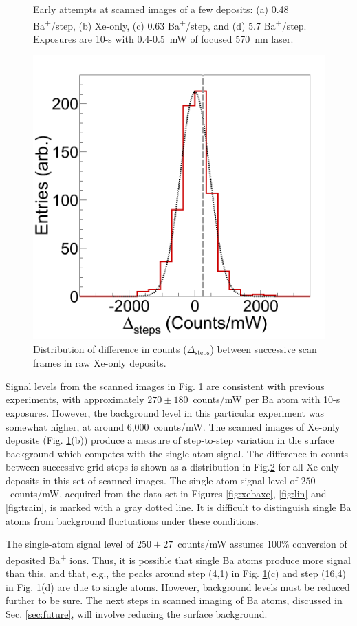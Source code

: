 \begin{figure}
                \caption{Early attempts at scanned images of a few deposits: (a) 0.48 Ba\textsuperscript{+}/step, (b) Xe-only, (c) 0.63 Ba\textsuperscript{+}/step, and (d) 5.7 Ba\textsuperscript{+}/step.  Exposures are 10-s with 0.4-0.5~mW of focused 570~nm laser.}
\label{fig:scans}
\end{figure}

\begin{figure} %
        \centering
                \includegraphics[width=.5\textwidth]{figures/xevarxe_scanDelta_trendline.png}
                \caption{Distribution of difference in counts ($\Delta_{\text{steps}}$) between successive scan frames in raw Xe-only deposits.}
\label{fig:scanVarXe}
\end{figure}

Signal levels from the scanned images in Fig. \ref{fig:scans} are consistent with previous experiments, with approximately $270 \pm 180$~counts/mW per Ba atom with 10-s exposures.  However, the background level in this particular experiment was somewhat higher, at around 6,000~counts/mW.  The scanned images of Xe-only deposits (Fig. \ref{fig:scans}(b)) produce a measure of step-to-step variation in the surface background which competes with the single-atom signal.  The difference in counts between successive grid steps is shown as a distribution in Fig.\ref{fig:scanVarXe} for all Xe-only deposits in this set of scanned images.  The single-atom signal level of $250$~counts/mW, acquired from the data set in Figures \ref{fig:xebaxe}, \ref{fig:lin} and \ref{fig:train}, is marked with a gray dotted line.  It is difficult to distinguish single Ba atoms from background fluctuations under these conditions.

The single-atom signal level of $250 \pm 27$~counts/mW assumes 100\% conversion of deposited Ba\textsuperscript{+} ions.  Thus, it is possible that single Ba atoms produce more signal than this, and that, e.g., the peaks around step (4,1) in Fig. \ref{fig:scans}(c) and step (16,4) in Fig. \ref{fig:scans}(d) are due to single atoms.  However, background levels must be reduced further to be sure.  The next steps in scanned imaging of Ba atoms, discussed in Sec. \ref{sec:future}, will involve reducing the surface background.


